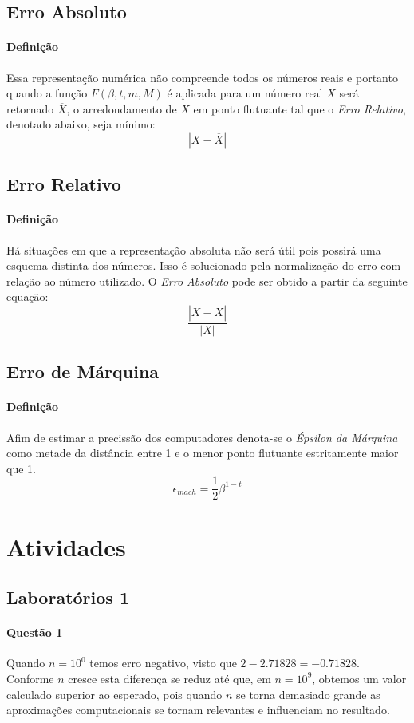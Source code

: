 \documentclass{article}
\begin{document}
        \subsection{Erro Absoluto}
            \paragraph{Definição}Essa representação numérica não compreende todos os números reais e portanto quando a função $F(\beta, t, m, M)$ é aplicada para um número real $X$ será retornado $\overline{X}$, o arredondamento de $X$ em ponto flutuante tal que o \textit{Erro Relativo}, denotado abaixo, seja mínimo:
                \[\boxed{|X-\overline{X}|}\]

        \subsection{Erro Relativo}
            \paragraph{Definição}Há situações em que a representação absoluta não será útil pois possirá uma esquema distinta dos números. Isso é solucionado pela normalização do erro com relação ao número utilizado. O \textit{Erro Absoluto} pode ser obtido a partir da seguinte equação:
                \[\boxed{\frac{|X-\overline{X}|}{|X|}}\]

        \subsection{Erro de Márquina}
            \paragraph{Definição}Afim de estimar a precissão dos computadores denota-se o \textit{Épsilon da Márquina} como metade da distância entre 1 e o menor ponto flutuante estritamente maior que 1.
                \[\boxed{\epsilon_{mach}=\frac{1}{2}\beta^{1-t}}\]
\newpage

    \section{Atividades}
        \subsection{Laboratórios 1}
            \paragraph{Questão 1}Quando $n = 10^{0}$ temos erro negativo, visto que $2 - 2.71828 = -0.71828$. Conforme $n$ cresce esta diferença se reduz até que, em $n = 10^{9}$, obtemos um valor calculado superior ao esperado, pois quando $n$ se torna demasiado grande as aproximações computacionais se tornam relevantes e influenciam no resultado.
\end{document}
